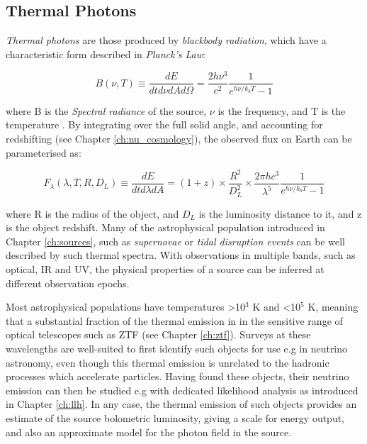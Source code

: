  \subsection*{Thermal Photons}
 
 \emph{Thermal photons} are those produced by \emph{blackbody radiation}, which have a characteristic form described in \emph{Planck's Law}:
 
 \begin{equation}
 	B(\nu, T)  \equiv \frac{dE}{dt d\nu dA d\Omega} = \frac{2h\nu^{3}}{c^{2}} \frac{1}{e^{h\nu/k_{b}T} -1}
 \end{equation}

where B is the \emph{Spectral radiance} of the source, $\nu$ is the frequency, and T is the temperature . By integrating over the full solid angle, and accounting for redshifting (see Chapter \ref{ch:nu_cosmology}), the observed flux on Earth can be parameterised as:

 \begin{equation}
F_{\lambda}(\lambda, T, R, D_{L})	\equiv \frac{dE}{dt d\lambda dA}  = (1 + z) \times \frac{R^{2}}{D_{L}^{2}} \times \frac{2 \pi h c^{3}}{\lambda^{5}} \frac{1}{e^{h\nu/k_{b}T} -1}
\end{equation}

where R is the radius of the object, and $D_{L}$ is the luminosity distance to it, and z is the object redshift. Many of the astrophysical population introduced in Chapter \ref{ch:sources}, such as \emph{supernovae} or \emph{tidal disruption events} can be well described by such thermal spectra. With observations in multiple bands, such as optical, IR and UV, the physical properties of a source can be inferred at different observation epochs. 

Most astrophysical populations have temperatures >10$^{3}$ K and <10$^{5}$ K, meaning that a substantial fraction of the thermal emission in in the sensitive range of optical telescopes such as ZTF (see Chapter \ref{ch:ztf}). Surveys at these wavelengths are well-suited to first identify such objects for use e.g in neutrino astronomy, even though this thermal emission is unrelated to the hadronic processes which accelerate particles. Having found these objects, their neutrino emission can then be studied e.g with dedicated likelihood analysis as introduced in Chapter \ref{ch:llh}. In any case, the thermal emission of such objects provides an estimate of the source bolometric luminosity, giving a scale for energy output, and also an approximate model for the photon field in the source.

